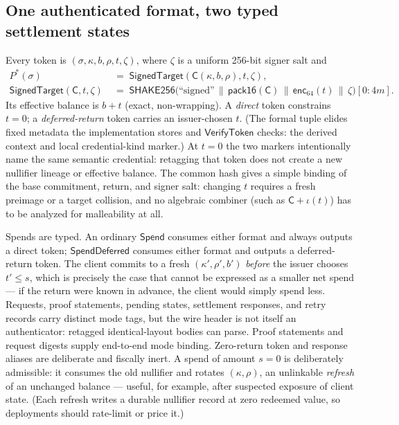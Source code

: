\documentclass[11pt]{article}
\newcommand{\shake}{\mathsf{SHAKE256}}
\newcommand{\enc}{\mathsf{enc}_{64}}
\newcommand{\Cred}{\mathsf{C}}
\begin{document}
\subsection{One authenticated format, two typed settlement states}

Every token is $(\sigma,\kappa,b,\rho,t,\zeta)$, where $\zeta$ is a
uniform 256-bit signer salt and
\[
\begin{aligned}
P^\ast(\sigma) &\;=\;
\mathsf{SignedTarget}(\Cred(\kappa,b,\rho),t,\zeta), \\
\mathsf{SignedTarget}(\Cred,t,\zeta)
&\;=\; \shake\bigl(\text{``signed''} \,\|\,
\mathsf{pack16}(\Cred) \,\|\, \enc(t) \,\|\, \zeta\bigr)[0:4m].
\end{aligned}
\]
Its effective balance is $b+t$ (exact, non-wrapping).  A \emph{direct}
token constrains $t=0$; a \emph{deferred-return} token carries an
issuer-chosen $t$. (The formal tuple elides fixed metadata the implementation
stores and $\mathsf{VerifyToken}$ checks: the derived context and
local credential-kind marker.) At $t=0$ the two markers intentionally name the
same semantic credential: retagging that token does not create a new
nullifier lineage or effective balance. The common hash gives a simple binding of the base
commitment, return, and signer salt:
changing $t$ requires a fresh preimage or a target collision, and no
algebraic combiner (such as $\Cred + \iota(t)$) has to be analyzed for
malleability at all.

Spends are typed. An ordinary $\mathsf{Spend}$ consumes either format and
always outputs a direct token; $\mathsf{SpendDeferred}$ consumes
either format and outputs a deferred-return token. The client commits to a
fresh $(\kappa', \rho', b')$ \emph{before} the issuer chooses $t' \le s$, which is
precisely the case that cannot be expressed as a smaller net spend --- if the
return were known in advance, the client would simply spend less. Requests,
proof statements, pending states, settlement responses, and retry records
carry distinct mode tags, but the wire header is not itself an authenticator:
retagged identical-layout bodies can parse. Proof statements and request
digests supply end-to-end mode binding. Zero-return token and response aliases
are deliberate and fiscally inert. A spend of
amount $s = 0$ is deliberately admissible: it consumes the old nullifier
and rotates $(\kappa, \rho)$, an unlinkable \emph{refresh} of an
unchanged balance --- useful, for example, after suspected exposure of
client state. (Each refresh writes a durable nullifier record at zero
redeemed value, so deployments should rate-limit or price it.)
\end{document}
